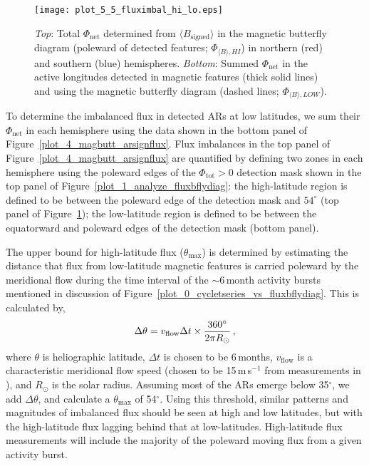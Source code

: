 \begin{figure}[!t]
\centerline{\texttt{[image: plot\_5\_5\_fluximbal\_hi\_lo.eps]}}
\caption[The $\Phi_{\mathrm{net}}$ measured in each hemisphere.]{\emph{Top}: Total $\Phi_{\mathrm{net}}$ determined from $\langle B_{\mathrm{signed}}\rangle$ in the magnetic butterfly diagram (poleward of detected features; $\Phi_{\langle B \rangle,HI}$) in northern (red) and southern (blue) hemispheres. \emph{Bottom}: Summed $\Phi_{\mathrm{net}}$ in the active longitudes detected in magnetic features (thick solid lines) and using the magnetic butterfly diagram (dashed lines; $\Phi_{\langle B \rangle,LOW}$).}
\label{plot_5_fluximbal_hi_lo}
\end{figure}

To determine the imbalanced flux in detected \glspl{AR} at low latitudes, we sum their $\Phi_{\mathrm{net}}$ in each hemisphere using the data shown in the bottom panel of Figure~\ref{plot_4_magbutt_arsignflux}. 
Flux imbalances in the top panel of Figure~\ref{plot_4_magbutt_arsignflux} are quantified by defining two zones in each hemisphere using the poleward edges of the $\Phi_{\mathrm{tot}} > 0$ detection mask shown in the top panel of Figure~\ref{plot_1_analyze_fluxbflydiag}: the high-latitude region is defined to be between the poleward edge of the detection mask and $54^{\circ}$ (top panel of Figure~\ref{plot_5_fluximbal_hi_lo}); the low-latitude region is defined to be between the equatorward and poleward edges of the detection mask (bottom panel). 

The upper bound for high-latitude flux ($\theta_{\mathrm{max}}$) is determined by estimating the distance that flux from low-latitude magnetic features is carried poleward by the meridional flow during the time interval of the $\sim$6\,month activity bursts mentioned in discussion of Figure~\ref{plot_0_cycletseries_vs_fluxbflydiag}. This is calculated by,
\begin{equation}
\Delta \theta = v_{\mathrm{flow}}\Delta t \times \frac{360^{\circ}}{2\pi R_{\odot}} \mbox{\,,}
\end{equation}
where $\theta$ is heliographic latitude, $\Delta t$ is chosen to be 6\,months, $v_{\mathrm{flow}}$ is a characteristic meridional flow speed (chosen to be 15\,m\,s$^{-1}$ from measurements in \citet{Hathaway:2010}), and $R_{\odot}$ is the solar radius. Assuming most of the \glspl{AR} emerge below 35$^{\circ}$, we add $\Delta \theta$, and calculate a $\theta_{\mathrm{max}}$ of 54$^\circ$. 
Using this threshold, similar patterns and magnitudes of imbalanced flux should be seen at high and low latitudes, but with the high-latitude flux lagging behind that at low-latitudes. High-latitude flux measurements will include the majority of the poleward moving flux from a given activity burst.

